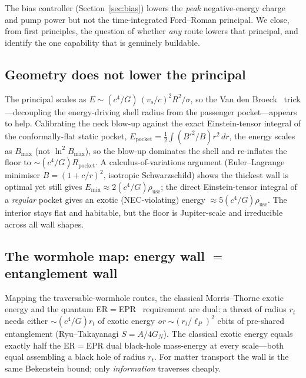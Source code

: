 \documentclass[11pt,a4paper]{article}
\begin{document}
The bias controller (Section~\ref{sec:bias}) lowers the \emph{peak} negative-energy charge and pump power but not the time-integrated Ford--Roman principal. We close, from first principles, the question of whether \emph{any} route lowers that principal, and identify the one capability that is genuinely buildable.

\subsection{Geometry does not lower the principal}
The principal scales as $E\sim(c^{4}/G)\,(v_{s}/c)^{2}R^{2}/\sigma$, so the Van den Broeck~\cite{VanDenBroeck1999} trick---decoupling the energy-driving shell radius from the passenger pocket---appears to help. Calibrating the neck blow-up against the exact Einstein-tensor integral of the conformally-flat static pocket, $E_{\mathrm{pocket}}=\tfrac12\!\int(B'^{2}/B)r^{2}\,dr$, the energy scales as $B_{\max}$ (not $\ln^{2}B_{\max}$), so the blow-up dominates the shell and re-inflates the floor to $\sim(c^{4}/G)R_{\mathrm{pocket}}$. A calculus-of-variations argument (Euler--Lagrange minimiser $B=(1+c/r)^{2}$, isotropic Schwarzschild) shows the thickest wall is optimal yet still gives $E_{\min}\approx2(c^{4}/G)\rho_{\mathrm{use}}$; the direct Einstein-tensor integral of a \emph{regular} pocket gives an exotic (NEC-violating) energy $\approx5(c^{4}/G)\rho_{\mathrm{use}}$. The interior stays flat and habitable, but the floor is Jupiter-scale and irreducible across all wall shapes.

\subsection{The wormhole map: energy wall $=$ entanglement wall}
Mapping the traversable-wormhole routes, the classical Morris--Thorne exotic energy and the quantum ER$=$EPR~\cite{MaldacenaSusskind2013} requirement are dual: a throat of radius $r_{t}$ needs either $\sim(c^{4}/G)r_{t}$ of exotic energy \emph{or} $\sim(r_{t}/\ell_{P})^{2}$ ebits of pre-shared entanglement (Ryu--Takayanagi $S=A/4G_{N}$). The classical exotic energy equals exactly half the ER$=$EPR dual black-hole mass-energy at every scale---both equal assembling a black hole of radius $r_{t}$. For matter transport the wall is the same Bekenstein bound; only \emph{information} traverses cheaply.
\end{document}
